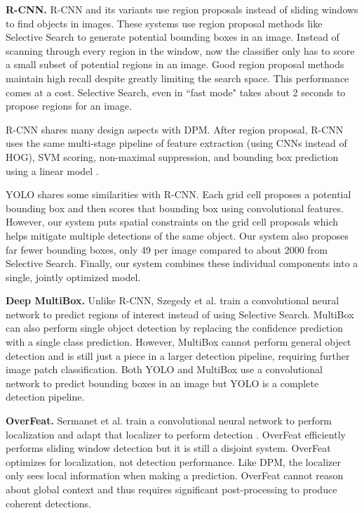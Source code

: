 \documentclass{article} %
\begin{document}
\textbf{R-CNN.} R-CNN and its variants use region proposals instead of sliding windows to find objects in images. These systems use region proposal methods like Selective Search \cite{uijlings2013selective} to generate potential bounding boxes in an image. Instead of scanning through every region in the window, now the classifier only has to score a small subset of potential regions in an image. Good region proposal methods maintain high recall despite greatly limiting the search space. This performance comes at a cost. Selective Search, even in ``fast mode" takes about 2 seconds to propose regions for an image.

R-CNN shares many design aspects with DPM. After region proposal, R-CNN uses the same multi-stage pipeline of feature extraction (using CNNs instead of HOG), SVM scoring, non-maximal suppression, and bounding box prediction using a linear model \cite{girshick2014rich}. 

YOLO shares some similarities with R-CNN. Each grid cell proposes a potential bounding box and then scores that bounding box using convolutional features. However, our system puts spatial constraints on the grid cell proposals which helps mitigate multiple detections of the same object. Our system also proposes far fewer bounding boxes, only 49 per image compared to about 2000 from Selective Search. Finally, our system combines these individual components into a single, jointly optimized model.

\textbf{Deep MultiBox.} Unlike R-CNN, Szegedy et al. train a convolutional neural network to predict regions of interest \cite{erhan2014scalable} instead of using Selective Search. MultiBox can also perform single object detection by replacing the confidence prediction with a single class prediction. However, MultiBox cannot perform general object detection and is still just a piece in a larger detection pipeline, requiring further image patch classification. Both YOLO and MultiBox use a convolutional network to predict bounding boxes in an image but YOLO is a complete detection pipeline.

\textbf{OverFeat.} Sermanet et al. train a convolutional neural network to perform localization and adapt that localizer to perform detection \cite{DBLP:journals/corr/SermanetEZMFL13}. OverFeat efficiently performs sliding window detection but it is still a disjoint system. OverFeat optimizes for localization, not detection performance. Like DPM, the localizer only sees local information when making a prediction. OverFeat cannot reason about global context and thus requires significant post-processing to produce coherent detections.
\end{document}
